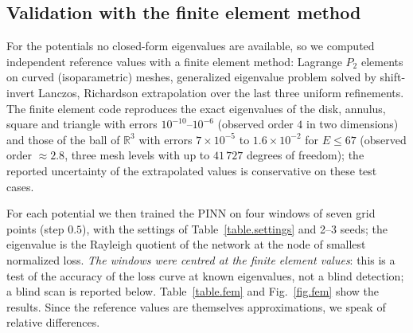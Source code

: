 \documentclass[10pt]{amsart}
\newenvironment{revblock}{\color{blue}}{}
\theoremstyle{definition}
\theoremstyle{remark}
\theoremstyle{plain}
\newcommand{\R}{\mathbb{R}}
\begin{document}
\subsection{Validation with the finite element method}\label{sec.fem}
\begin{revblock}
For the potentials no closed-form eigenvalues are available, so we computed independent reference
values with a finite element method: Lagrange $P_2$ elements on curved (isoparametric) meshes,
generalized eigenvalue problem solved by shift-invert Lanczos, Richardson extrapolation over the
last three uniform refinements. The finite element code reproduces the exact eigenvalues of the
disk, annulus, square and triangle with errors $10^{-10}$--$10^{-6}$ (observed order $4$ in two
dimensions) and those of the ball of $\R^3$ with errors $7\times10^{-5}$ to $1.6\times10^{-2}$
for $E\le67$ (observed order $\approx2.8$, three mesh levels with up to $41\,727$ degrees of
freedom); the reported uncertainty of the extrapolated values is conservative on these test cases.

For each potential we then trained the PINN on four windows of seven grid points (step $0.5$),
with the settings of Table~\ref{table.settings} and 2--3 seeds; the eigenvalue is the Rayleigh
quotient of the network at the node of smallest normalized loss. \emph{The windows were centred at
the finite element values}: this is a test of the accuracy of the loss curve at known eigenvalues,
not a blind detection; a blind scan is reported below. Table~\ref{table.fem} and Fig.~\ref{fig.fem}
show the results. Since the reference values are themselves approximations, we speak of relative
differences.


\end{revblock}
\end{document}
